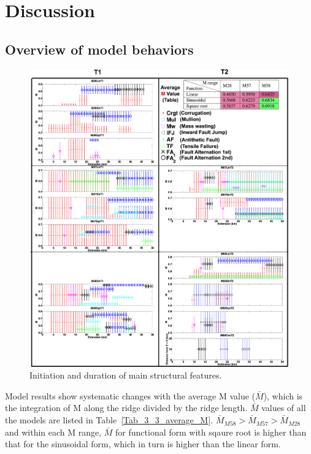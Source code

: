 \pagebreak
\section{Discussion}

\subsection{Overview of model behaviors}

\begin{figure}[h]
  \centering
    \includegraphics[width=1.0\textwidth]{./Figures/fig_Discussion_Result_Summary_1_Combine_together.eps}
    \caption{Initiation and duration of main structural features.}%
 \label{fig_Discussion_Result_Summary_1_Combine_together}
\end{figure} 

Model results show systematic changes with the average M value ($\bar{M}$), which is the integration of M along the ridge divided by the ridge length. $\bar{M}$ values of all the models are listed in Table~\hyperref[Tab_3_3_average_M]{\ref{Tab_3_3_average_M}}. $\bar{M}_{M58} > \bar{M}_{M57} > \bar{M}_{M28}$ and within each M range, $\bar{M}$ for functional form with sqaure root is higher than that for the sinusoidal form, which in turn is higher than the linear form.

